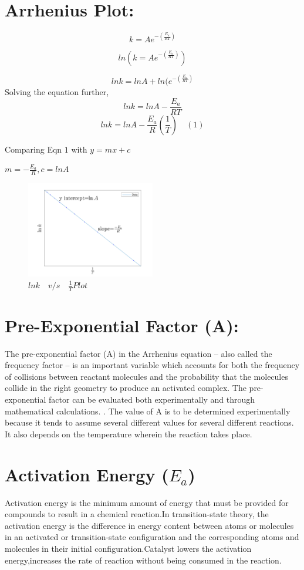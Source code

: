 \documentclass[a4paper]{article}
\begin{document}
\section{\textbf{Arrhenius Plot:}}
$$k=Ae^{-(\frac{E_a}{RT})}$$

$$ln(k=Ae^{-(\frac{E_a}{RT})})$$

$$lnk=lnA+ln(e^{-(\frac{E_a}{RT})}$$
Solving the equation further,
$$lnk=lnA-{\frac{E_a}{RT}}$$
$$lnk=lnA-{\frac{E_a}{R}}(\frac{1}{T})\quad(1)$$

Comparing Eqn $1$ with $y=mx+c$

$m=-{\frac{E_a}{R}} , c=lnA$
\newpage
\begin{figure}[ht]
    \centering
    \includegraphics[width=0.5\textwidth]{ahhrenius.png}
    \caption{$lnk\quad v/s \quad \frac{1}{T}Plot$}
    \label{fig:example}
\end{figure}

\section{\textbf{ Pre-Exponential Factor (A):}}

The pre-exponential factor (A) in the Arrhenius equation – also called the frequency factor – is an important
variable which accounts for both the frequency of collisions between reactant molecules and the probability
that the molecules collide in the right geometry to produce an activated complex. The pre-exponential factor
can be evaluated both experimentally and through mathematical calculations. 
 \cite{ref=r2}.
The value of A is to be determined experimentally because it tends to assume several different values for several different reactions. It also depends on the temperature wherein the reaction takes place.

\section{\textbf{Activation Energy ($E_a$)}}
Activation energy is the minimum amount of energy that must be provided for compounds to result in a chemical reaction.In transition-state theory, the activation energy is the difference in energy content between atoms or molecules in an activated or transition-state configuration and the corresponding atoms and molecules in their initial configuration.Catalyst lowers the activation energy,increases the rate of reaction without being consumed in the reaction.
\end{document}
